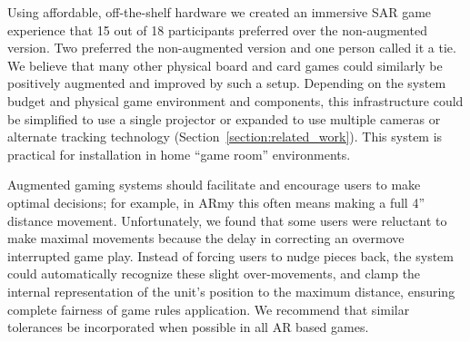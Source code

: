 Using affordable, off-the-shelf hardware we created an immersive SAR
game experience that 15 out of 18 participants preferred over the
non-augmented version.  Two preferred the non-augmented version and
one person called it a tie.
We believe that many other physical board and card games could
similarly be positively augmented and improved by such a setup.  
%
Depending on the system budget and physical game environment and
components, this infrastructure could be simplified to use a single
projector or expanded to use multiple cameras or alternate tracking
technology (Section~\ref{section:related_work}).  This system is
practical for installation in home ``game room'' environments.


Augmented gaming systems should facilitate and encourage users to make
optimal decisions; for example, in ARmy this often means making a full
4'' distance movement.
Unfortunately, we found that some users were reluctant to make maximal
movements because the delay in correcting an overmove interrupted game
play.
Instead of forcing users to nudge pieces back, the system could
automatically recognize these slight over-movements, and clamp the
internal representation of the unit's position to the maximum
distance, ensuring complete fairness of game rules application.
We recommend that similar tolerances be incorporated when possible in
all AR based games.

